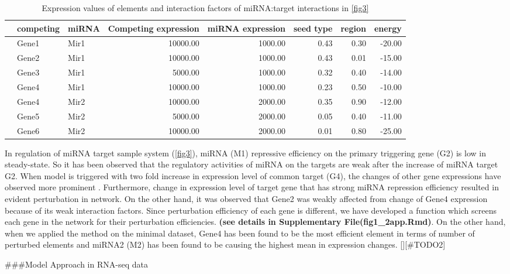 \documentclass[a4,center,fleqn]{NAR}
\begin{document}
\begin{table}[ht]
\centering
\caption{Expression values of elements and interaction factors of miRNA:target interactions in \autoref{fig3}} 
\begin{tabular}{rllrrrrr}
  \hline
 & competing & miRNA & Competing expression & miRNA expression & seed type & region & energy \\ 
  \hline
   & Gene1 & Mir1 & 10000.00 & 1000.00 & 0.43 & 0.30 & -20.00 \\ 
   & Gene2 & Mir1 & 10000.00 & 1000.00 & 0.43 & 0.01 & -15.00 \\ 
   & Gene3 & Mir1 & 5000.00 & 1000.00 & 0.32 & 0.40 & -14.00 \\ 
   & Gene4 & Mir1 & 10000.00 & 1000.00 & 0.23 & 0.50 & -10.00 \\ 
   & Gene4 & Mir2 & 10000.00 & 2000.00 & 0.35 & 0.90 & -12.00 \\ 
   & Gene5 & Mir2 & 5000.00 & 2000.00 & 0.05 & 0.40 & -11.00 \\ 
   & Gene6 & Mir2 & 10000.00 & 2000.00 & 0.01 & 0.80 & -25.00 \\ 
   \hline
\end{tabular}
\label{tab:one}
\end{table}

In regulation of miRNA target sample system (\autoref{fig3}), miRNA (M1)
repressive efficiency on the primary triggering gene (G2) is low in
steady-state. So it has been observed that the regulatory activities of
miRNA on the targets are weak after the increase of miRNA target G2.
When model is triggered with two fold increase in expression level of
common target (G4), the changes of other gene expressions have observed
more prominent \href{}{}. Furthermore, change in expression level of
target gene that has strong miRNA repression efficiency resulted in
evident perturbation in network. On the other hand, it was observed that
Gene2 was weakly affected from change of Gene4 expression because of its
weak interaction factors. Since perturbation efficiency of each gene is
different, we have developed a function which screens each gene in the
network for their perturbation efficiencies. \textbf{(see details in
Supplementary File(fig1\_2app.Rmd)}. On the other hand, when we applied
the method on the minimal dataset, Gene4 has been found to be the most
efficient element in terms of number of perturbed elements and miRNA2
(M2) has been found to be causing the highest mean in expression
changes. {[}{]}{[}\#TODO2{]}

\#\#\#Model Approach in RNA-seq data
\end{document}
